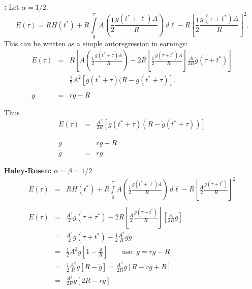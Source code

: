 \documentclass[12pt,compress,handout]{beamer}  %
\begin{document}
\begin{frame}

\textbf{\insertsection:} Let $\alpha =1/2$.
\begin{equation*}
    E(\tau )
    =
    RH(t^{*})+R\int\limits_{0}^{\tau }A\left( \dfrac{1}{2}
        \dfrac{g(t^{*}+\ell )A}{R}\right) \,d\ell
    -R\left[ \dfrac{1}{2}\dfrac{g(\tau +t^{*})A}{R}\right] ^{2}.
\end{equation*}
This can be written as a simple autoregression in earnings: {\small
\begin{eqnarray*}
    \dot{E}(\tau )
    &=&
    R\left[
        A\left( \frac{1}{2}\frac{g(t^{*}+\tau )A}{R}\right)
        -2R\left[ \frac{1}{2}\frac{g(\tau +t^{*})A}{R}\right] \frac{A}{2R}
        \dot{g}(\tau +t^{*})
    \right] \\
    &=&
    \frac{1}{2}A^{2}[g(t^{*}+\tau )(R-\dot{g}(t^{*}+\tau )].\\\\
    \dot{g}
    &=&
    rg-R
\end{eqnarray*}
}
\end{frame}


\begin{frame}
Thus
\begin{eqnarray*}
    \dot{E}(\tau )
    &=&
    \frac{A^2}{2R}\left[g(t^{*}+\tau)
    \left(R-\dot{g}(t^{*}+\tau)\right)\right]\\\\\\
\dot{g} &=&rg-R \\
\ddot{g} &=&r\dot{g}.
\end{eqnarray*}
\end{frame}


\begin{frame}

\textbf{Haley-Rosen:} $\alpha = \beta = 1/2$ {\small
\begin{eqnarray*}
    E(\tau )
    &=&
    RH(t^{*})+R\int\limits_{0}^{\tau }A\left( \frac{1}{2}
    \frac{g(t^{*}+\ell )A}{R}\right) \,d\ell
    -R\left[ \frac{A}{2}\frac{g(\tau +t^{*})}{R}\right]^2\\\\
    \dot{E}(\tau )
    &=&\frac{A^{2}}{2}g(\tau +\tau ^{*})
        -2R\left[ \frac{A}{2}\frac{g(\tau+t^{*})}{R}\right]
        \left[ \frac{A}{2R}\dot{g}\right] \\
    &=&\frac{A^{2}}{2}g(\tau +t^{*})-\frac{1}{2}\frac{A^{2}}{R}g\dot{g} \\
    &=&\frac{1}{2}A^{2}g\left[ 1-\frac{\dot{g}}{R}\right]
        \qquad\text{use: } \dot{g}=rg-R \\
    &=&\frac{1}{2}\frac{A^{2}}{R}g[R-\dot{g}]=\frac{A^{2}}{2R}g[R-rg+R] \\
    &=&\frac{A^{2}}{2R}g[2R-rg]
\end{eqnarray*}
}

\end{frame}
\end{document}
